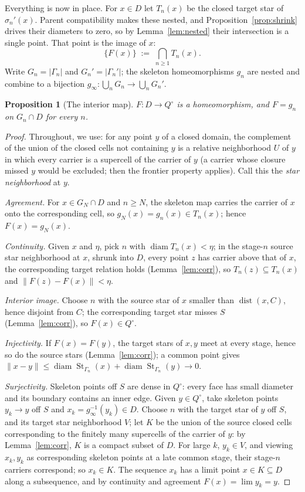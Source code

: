 \documentclass[11pt,a4paper]{article}
\theoremstyle{jsplain}
\newtheorem{proposition}[theorem]{Proposition}
\theoremstyle{jsdefn}
\newcommand{\St}{\operatorname{St}}
\newcommand{\diam}{\operatorname{diam}}
\newcommand{\dist}{\operatorname{dist}}
\begin{document}
Everything is now in place. For $x\in D$ let $T_n(x)$ be the closed
target star of $\sigma_n'(x)$. Parent compatibility makes these nested,
and Proposition~\ref{prop:shrink} drives their diameters to zero, so by
Lemma~\ref{lem:nested} their intersection is a single point. That point
is the image of $x$:
\[
  \{F(x)\}\;:=\;\bigcap_{n\ge1}T_n(x).
\]
Write $G_n=|\Gamma_n|$ and $G_n'=|\Gamma_n'|$; the skeleton
homeomorphisms $g_n$ are nested and combine to a bijection
$g_\infty:\bigcup_nG_n\to\bigcup_nG_n'$.

\begin{proposition}[The interior map]\label{prop:homeo}
$F:D\to Q^\circ$ is a homeomorphism, and $F=g_n$ on
$G_n\cap D$ for every $n$.
\end{proposition}
\begin{proof}
Throughout, we use: for any point $y$ of a closed domain, the
complement of the union of the closed cells not containing $y$ is a
relative neighborhood $U$ of $y$ in which every carrier is a supercell
of the carrier of $y$ (a carrier whose closure missed $y$ would be
excluded; then the frontier property applies). Call this the
\emph{star neighborhood} at $y$.

\emph{Agreement.} For $x\in G_N\cap D$ and $n\ge N$, the skeleton map
carries the carrier of $x$ onto the corresponding cell, so
$g_N(x)=g_n(x)\in T_n(x)$; hence $F(x)=g_N(x)$.

\emph{Continuity.} Given $x$ and $\eta$, pick $n$ with
$\diam T_n(x)<\eta$; in the stage-$n$ source star neighborhood at $x$,
shrunk into $D$, every point $z$ has carrier above that of $x$, the
corresponding target relation holds (Lemma~\ref{lem:corr}), so
$T_n(z)\subseteq T_n(x)$ and $\|F(z)-F(x)\|<\eta$.

\emph{Interior image.} Choose $n$ with the source star of $x$ smaller
than $\dist(x,C)$, hence disjoint from $C$; the corresponding target
star misses $S$ (Lemma~\ref{lem:corr}), so $F(x)\in Q^\circ$.

\emph{Injectivity.} If $F(x)=F(y)$, the target stars of $x,y$ meet at
every stage, hence so do the source stars
(Lemma~\ref{lem:corr}); a common point gives
$\|x-y\|\le\diam\St_{\Gamma_n}(x)+\diam\St_{\Gamma_n}(y)\to0$.

\emph{Surjectivity.} Skeleton points off $S$ are dense in $Q^\circ$:
every face has small diameter and its boundary contains an inner
edge. Given $y\in Q^\circ$, take skeleton points $y_k\to y$ off $S$
and $x_k=g_\infty^{-1}(y_k)\in D$. Choose $n$ with the target star of
$y$ off $S$, and its target star neighborhood $V$; let $K$ be the
union of the source closed cells corresponding to the finitely many
supercells of the carrier of $y$: by Lemma~\ref{lem:corr}, $K$ is a
compact subset of $D$. For large $k$, $y_k\in V$, and viewing
$x_k,y_k$ as corresponding skeleton points at a late common stage,
their stage-$n$ carriers correspond; so $x_k\in K$. The sequence
$x_k$ has a limit point $x\in K\subseteq D$ along a subsequence, and
by continuity and agreement $F(x)=\lim y_k=y$.


\end{proof}
\end{document}
